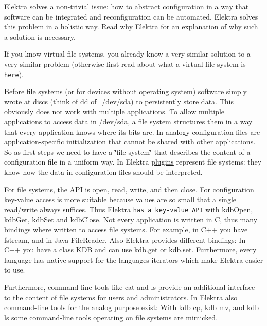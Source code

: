 Elektra solves a non-\/trivial issue\+: how to abstract configuration in a way that software can be integrated and reconfiguration can be automated. Elektra solves this problem in a holistic way. Read \hyperlink{doc_WHY_md}{why Elektra} for an explanation of why such a solution is necessary.

If you know virtual file systems, you already know a very similar solution to a very similar problem (otherwise first read about what a virtual file system is \href{https://en.wikipedia.org/wiki/Virtual_file_system}{\tt here}).

Before file systems (or for devices without operating system) software simply wrote at discs (think of {\ttfamily dd of=/dev/sda}) to persistently store data. This obviously does not work with multiple applications. To allow multiple applications to access data in {\ttfamily /dev/sda}, a file system structures them in a way that every application knows where its bits are. In analogy configuration files are application-\/specific initialization that cannot be shared with other applications. So as first steps we need to have a \char`\"{}file system\char`\"{} that describes the content of a configuration file in a uniform way. In Elektra \hyperlink{src_plugins_README_md}{plugins} represent file systems\+: they know how the data in configuration files should be interpreted.

For file systems, the A\+PI is {\ttfamily open}, {\ttfamily read}, {\ttfamily write}, and then {\ttfamily close}. For configuration key-\/value access is more suitable because values are so small that a single read/write always suffices. Thus Elektra \href{https://doc.libelektra.org/api/current/html}{\tt has a key-\/value A\+PI} with {\ttfamily kdb\+Open}, {\ttfamily kdb\+Get}, {\ttfamily kdb\+Set} and {\ttfamily kdb\+Close}. Not every application is written in C, thus many {\ttfamily bindings} where written to access file systems. For example, in C++ you have {\ttfamily fstream}, and in Java {\ttfamily File\+Reader}. Also Elektra provides different bindings\+: In C++ you have a class {\ttfamily K\+DB} and can use {\ttfamily kdb.\+get} or {\ttfamily kdb.\+set}. Furthermore, every language has native support for the language\textquotesingle{}s iterators which make Elektra easier to use.

Furthermore, command-\/line tools like {\ttfamily cat} and {\ttfamily ls} provide an additional interface to the content of file systems for users and administrators. In Elektra also \hyperlink{doc_help_kdb_md}{command-\/line tools} for the analog purpose exist\+: With {\ttfamily kdb cp}, {\ttfamily kdb mv}, and {\ttfamily kdb ls} some command-\/line tools operating on file systems are mimicked.

